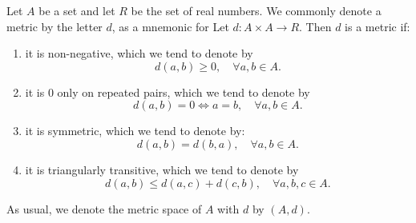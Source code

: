 Let $A$ be a set
and let $R$ be the set
of real numbers.
We commonly denote
a metric by the letter
$d$, as a mnemonic
for 
Let $d: A \times A \to R$.
Then $d$ is a metric if:
\begin{enumerate}
  \item
    it is non-negative,
    which we tend to denote by
    $$
      d(a, b) \geq 0, \quad \forall a,b \in A.
    $$
  \item
    it is $0$ only on repeated pairs, which we tend to denote
    by
    $$
      d(a, b) = 0 \Leftrightarrow a = b, \quad \forall a,b \in A.
    $$

  \item
    it is symmetric, which we tend to denote by:
    $$
      d(a, b) = d(b, a), \quad \forall a,b \in A.
    $$
  \item
    it is triangularly transitive, which we tend to
    denote by
    $$
      d(a, b) \leq d(a, c) + d(c, b), \quad \forall a,b,c \in A.
    $$
\end{enumerate}
As usual, we denote the metric space
of $A$ with $d$ by
$(A, d)$.
\strats
